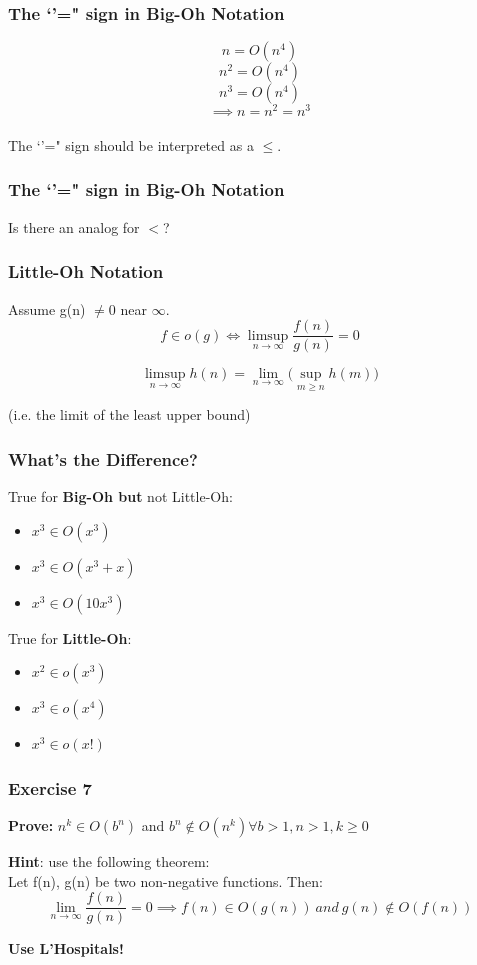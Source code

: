 \documentclass{beamer}
\begin{document}
\begin{frame}
\frametitle{  The `'=" sign in Big-Oh Notation}

$$n = O(n^{4})$$ 
$$n^{2} = O(n^{4})$$
$$n^{3} = O(n^{4})$$
$$\implies n = n^{2} = n^{3}$$ \\


The `'=" sign should be interpreted as a $\le$.

\end{frame}


\begin{frame}
\frametitle{ The `'="  sign in Big-Oh Notation}
\begin{center}
Is there an analog for $<$?
\end{center}
\end{frame}


\begin{frame}
\frametitle{Little-Oh Notation}

Assume g(n) $\neq$0 near $\infty$. 
$$f \in o(g) \iff   \limsup\limits_{n\rightarrow \infty} \frac{f(n)}{g(n)} = 0 $$ 

$$\limsup\limits_{n\rightarrow \infty} h(n) = \lim\limits_{n \to \infty} \Big (\sup_{m\geq n} h(m) \Big)$$ 

  (i.e. the limit of the least upper bound) 
\end{frame}

\begin{frame}
\frametitle{What's the Difference?}
{\color{green}True} for \textbf{Big-Oh but} \alert{not Little-Oh}:\\
\begin{itemize} 
\item $x^{3} \in O(x^{3})$ 
\item $x^{3} \in O(x^{3}+x)$ 
\item $x^{3} \in O(10x^{3})$ 
\end{itemize} 

{\color{green}True} for \textbf{Little-Oh}:
\begin{itemize} 
\item $x^{2} \in o(x^{3})$ 
\item $x^{3} \in o(x^{4})$ 
\item $x^{3} \in o(x!)$ 
\end{itemize} 
\end{frame}

 

\begin{frame} 
\frametitle{Exercise 7}
\textbf{Prove:} $n^{k} \in O(b^{n})$ and $b^{n} 	\notin O(n^{k}) \forall b> 1, n>1, k\geq 0$ \\
 \begin{center}
{\color{blue} \textbf{Hint}: use the following theorem: \\

Let f(n), g(n) be two non-negative functions. Then: $$\lim_{n \to \infty} \frac{f(n)}{g(n)} = 0 \implies f (n) \in O(g(n)) \ and \ g(n) 	\notin O(f(n))$$ }

\end{center}
\textbf{Use L'Hospitals! }


\end{frame}
\end{document}
